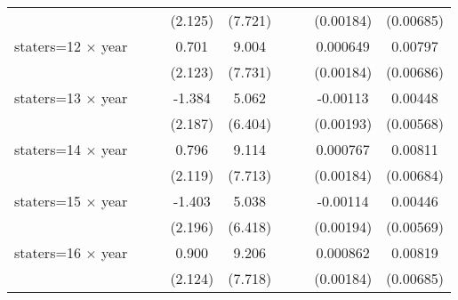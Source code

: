 {\begin{longtable}{l*{8}{c}}
                    &                     &                     &     (2.125)         &     (7.721)         &                     &                     &   (0.00184)         &   (0.00685)         \\
[1em]
staters=12 $\times$ year&                     &                     &       0.701         &       9.004         &                     &                     &    0.000649         &     0.00797         \\
                    &                     &                     &     (2.123)         &     (7.731)         &                     &                     &   (0.00184)         &   (0.00686)         \\
[1em]
staters=13 $\times$ year&                     &                     &      -1.384         &       5.062         &                     &                     &    -0.00113         &     0.00448         \\
                    &                     &                     &     (2.187)         &     (6.404)         &                     &                     &   (0.00193)         &   (0.00568)         \\
[1em]
staters=14 $\times$ year&                     &                     &       0.796         &       9.114         &                     &                     &    0.000767         &     0.00811         \\
                    &                     &                     &     (2.119)         &     (7.713)         &                     &                     &   (0.00184)         &   (0.00684)         \\
[1em]
staters=15 $\times$ year&                     &                     &      -1.403         &       5.038         &                     &                     &    -0.00114         &     0.00446         \\
                    &                     &                     &     (2.196)         &     (6.418)         &                     &                     &   (0.00194)         &   (0.00569)         \\
[1em]
staters=16 $\times$ year&                     &                     &       0.900         &       9.206         &                     &                     &    0.000862         &     0.00819         \\
                    &                     &                     &     (2.124)         &     (7.718)         &                     &                     &   (0.00184)         &   (0.00685)         \\

\end{longtable}}
